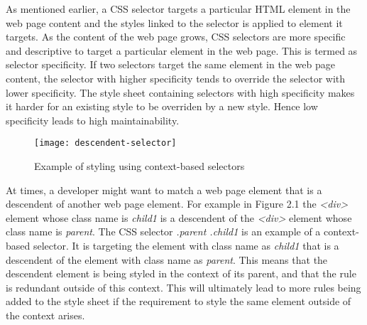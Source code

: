 \documentclass[12pt]{article}
\begin{document}

As mentioned earlier, a CSS selector targets a particular HTML element in the web page content and the styles linked to the selector is applied to element it targets. As the content of the web page grows, CSS selectors are more specific and descriptive to target a particular element in the web page. This is termed as selector specificity. If two selectors target the same element in the web page content, the selector with higher specificity tends to override the selector with lower specificity. The style sheet containing selectors with high specificity makes it harder for an existing style to be overriden by a new style. Hence low specificity leads to high maintainability.

\begin{figure}[h]
\texttt{[image: descendent-selector]}
\centering
\caption{Example of styling using context-based selectors}
\end{figure}

At times, a developer might want to match a web page element that is a descendent of another web page element. For example in Figure 2.1 the \textit{<div>} element whose class name is \textit{child1} is a descendent of the \textit{<div>} element whose class name is \textit{parent}. The CSS selector \textit{.parent .child1} is an example of a context-based selector. It is targeting the element with class name as \textit{child1} that is a descendent of the element with class name as \textit{parent}. This means that the descendent element is being styled in the context of its parent, and that the rule is redundant outside of this context. This will ultimately lead to more rules being added to the style sheet if the requirement to style the same element outside of the context arises.









\end{document}
